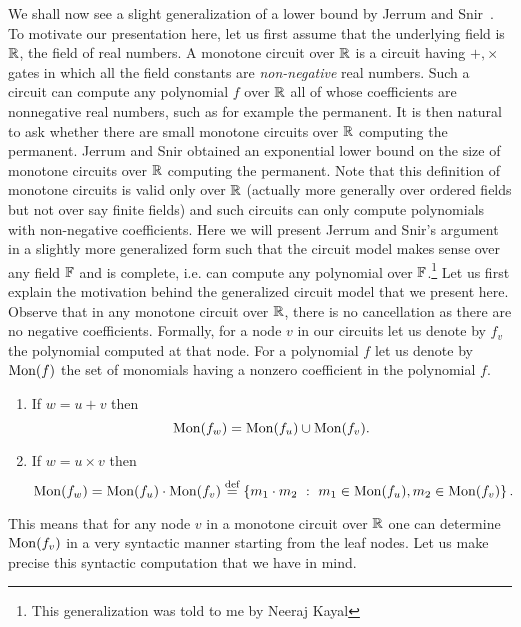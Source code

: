 We shall now see a  slight generalization of a lower bound by Jerrum and Snir~\cite{js82}. 
To motivate our presentation here, let us first assume that the underlying field is $\mathbb{R}$, the field of real numbers. 
A monotone circuit over $\mathbb{R}$ is a circuit having $+, \times$ gates in which all the field constants are {\em non-negative} real numbers. 
Such a circuit can compute any polynomial $f$ over $\mathbb{R}$ all of whose coefficients are nonnegative real numbers, such as for example the permanent. 
It is then natural to ask whether there are small monotone circuits over $\mathbb{R}$ computing the permanent. 
Jerrum and Snir \cite{js82} obtained an exponential lower bound on the size of monotone circuits over $\mathbb{R}$ computing the permanent. 
Note that this definition of monotone circuits is valid only over $\mathbb{R}$ (actually more generally over ordered fields but not over say finite fields) and such circuits can only compute polynomials with non-negative coefficients. 
Here we will present Jerrum and Snir's argument in a slightly more generalized form such that the circuit model makes sense over any field $\mathbb{F}$ and is complete, i.e.  can compute any polynomial over $\mathbb{F}$.\footnote{This generalization was told to me by Neeraj Kayal} Let us first explain the motivation behind the generalized circuit model that we present here. 
Observe that in any monotone circuit over $\mathbb{R}$, there is no cancellation as there are no negative coefficients. 
Formally, for a node $v$ in our circuits let us denote by $f_{v}$ the polynomial computed at that node. 
For a polynomial $f$ let us denote by $\mathrm{Mon}(f)$ the set of monomials having a nonzero coefficient in the polynomial $f$.
\begin{enumerate}
\item If $w = u + v$ then 
  $$ \mathrm{Mon}(f_{w}) = \mathrm{Mon}(f_{u}) \cup \mathrm{Mon}(f_{v}). $$
  
\item If $w = u \times v$ then
  $$ \mathrm{Mon}(f_{w}) = \mathrm{Mon}(f_{u}) \cdot \mathrm{Mon}(f_{v}) \stackrel{\text{def}}{=} \left\{{m_1\cdot m_2}\ : \ {m_1 \in \mathrm{Mon}(f_{u}), m_2\in \mathrm{Mon}(f_{v})}\right\}. $$
			
\end{enumerate}
This means that for any node $v$ in a monotone circuit over $\mathbb{R}$ one can determine $\mathrm{Mon}(f_{v})$ in a very syntactic manner starting from the leaf nodes. 
Let us make precise this syntactic computation that we have in mind.

